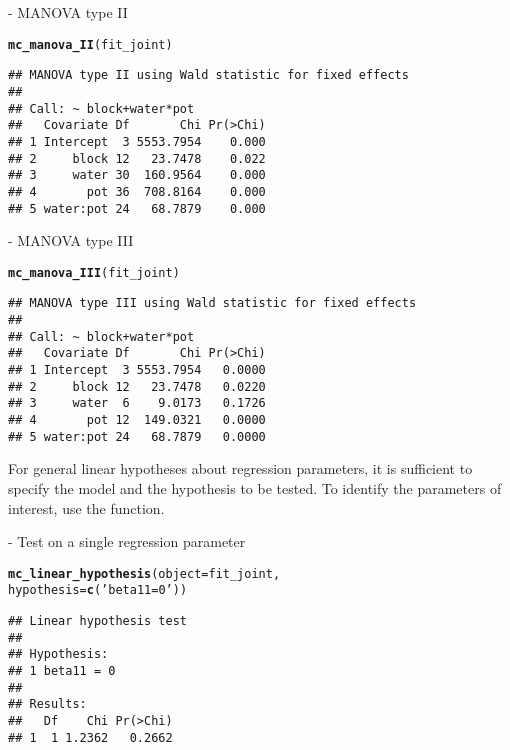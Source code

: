 \documentclass[article]{jss}\usepackage[]{graphicx}\usepackage[]{xcolor}
\makeatletter
\newcommand{\hlstr}[1]{\textcolor[rgb]{0.192,0.494,0.8}{#1}}%
\newcommand{\hlstd}[1]{\textcolor[rgb]{0.345,0.345,0.345}{#1}}%
\newcommand{\hlkwc}[1]{\textcolor[rgb]{0.333,0.667,0.333}{#1}}%
\newcommand{\hlkwd}[1]{\textcolor[rgb]{0.737,0.353,0.396}{\textbf{#1}}}%
\newenvironment{kframe}{%
 \def\at@end@of@kframe{}%
 \ifinner\ifhmode%
  \def\at@end@of@kframe{\end{minipage}}%
  \begin{minipage}{\columnwidth}%
 \fi\fi%
 \def\FrameCommand##1{\hskip\@totalleftmargin \hskip-\fboxsep
 \colorbox{shadecolor}{##1}\hskip-\fboxsep
     \hskip-\linewidth \hskip-\@totalleftmargin \hskip\columnwidth}%
 \MakeFramed {\advance\hsize-\width
   \@totalleftmargin\z@ \linewidth\hsize
   \@setminipage}}%
 {\par\unskip\endMakeFramed%
 \at@end@of@kframe}
\newenvironment{knitrout}{}{} %
\makeatother
\begin{document}
 - MANOVA type II

\begin{knitrout}
\color{fgcolor}\begin{kframe}
\begin{alltt}
\hlkwd{mc_manova_II}\hlstd{(fit_joint)}
\end{alltt}
\begin{verbatim}
## MANOVA type II using Wald statistic for fixed effects
## 
## Call: ~ block+water*pot
##   Covariate Df       Chi Pr(>Chi)
## 1 Intercept  3 5553.7954    0.000
## 2     block 12   23.7478    0.022
## 3     water 30  160.9564    0.000
## 4       pot 36  708.8164    0.000
## 5 water:pot 24   68.7879    0.000
\end{verbatim}
\end{kframe}
\end{knitrout}

 - MANOVA type III

\begin{knitrout}
\color{fgcolor}\begin{kframe}
\begin{alltt}
\hlkwd{mc_manova_III}\hlstd{(fit_joint)}
\end{alltt}
\begin{verbatim}
## MANOVA type III using Wald statistic for fixed effects
## 
## Call: ~ block+water*pot
##   Covariate Df       Chi Pr(>Chi)
## 1 Intercept  3 5553.7954   0.0000
## 2     block 12   23.7478   0.0220
## 3     water  6    9.0173   0.1726
## 4       pot 12  149.0321   0.0000
## 5 water:pot 24   68.7879   0.0000
\end{verbatim}
\end{kframe}
\end{knitrout}

For general linear hypotheses about regression parameters, it is sufficient to specify the model and the hypothesis to be tested. To identify the parameters of interest, use the  function.

 - Test on a single regression parameter

\begin{knitrout}
\color{fgcolor}\begin{kframe}
\begin{alltt}
\hlkwd{mc_linear_hypothesis}\hlstd{(}\hlkwc{object} \hlstd{=  fit_joint,}
                     \hlkwc{hypothesis} \hlstd{=} \hlkwd{c}\hlstd{(}\hlstr{'beta11 = 0'}\hlstd{))}
\end{alltt}
\begin{verbatim}
## Linear hypothesis test
## 
## Hypothesis:            
## 1 beta11 = 0
## 
## Results:
##   Df    Chi Pr(>Chi)
## 1  1 1.2362   0.2662
\end{verbatim}
\end{kframe}
\end{knitrout}
\end{document}
